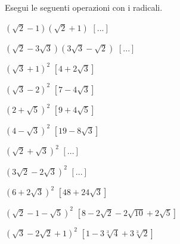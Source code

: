 \begin{esercizio}[\Ast]
 \label{ese:2.55}
Esegui le seguenti operazioni con i radicali.
 \begin{multicols}{2}
 \begin{enumeratea}
 \item $(\sqrt 2-1)(\sqrt 2+1)$
  \hfill $\left[...\right]$
 \item $(\sqrt 2-3\sqrt 3)(3\sqrt 3-\sqrt 2)$
  \hfill $\left[...\right]$
 \item $(\sqrt 3+1)^2$
  \hfill $\left[4+2\sqrt 3\right]$
 \item $(\sqrt 3-2)^2$
  \hfill $\left[7-4\sqrt 3\right]$
 \item $(2+\sqrt 5)^2$
  \hfill $\left[9+4\sqrt 5\right]$
 \item $(4-\sqrt 3)^2$
  \hfill $\left[19-8\sqrt 3\right]$
 \item $(\sqrt 2+\sqrt 3)^2$
  \hfill $\left[...\right]$
 \item $(3\sqrt 2-2\sqrt 3)^2$
  \hfill $\left[...\right]$
 \item $(6+2\sqrt 3)^2$
  \hfill $\left[48+24\sqrt 3\right]$
 \item $(\sqrt 2-1-\sqrt 5)^2$
  \hfill $\left[8-2\sqrt 2-2\sqrt{10}+2\sqrt 5\right]$
 \item $(\sqrt 3-2\sqrt 2+1)^2$
  \hfill $\left[1-3\sqrt[3]4+3\sqrt[3]2\right]$

\end{enumeratea}
\end{multicols}
\end{esercizio}
